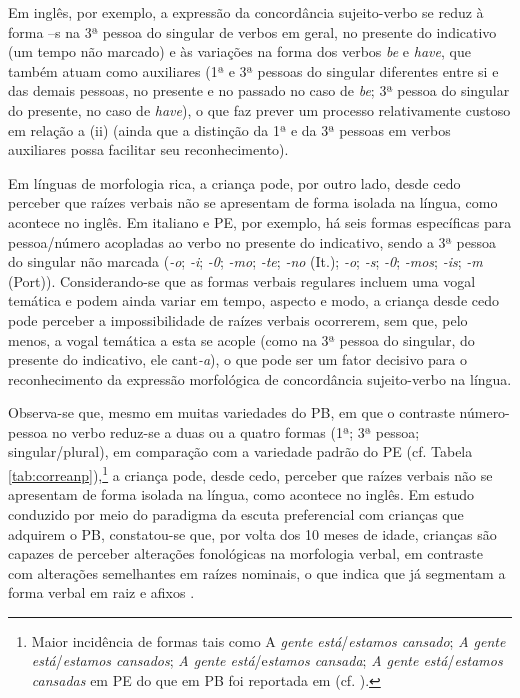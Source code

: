 \documentclass[output=paper]{LSP/langsci}
\begin{document}
Em inglês, por exemplo, a expressão da concordância sujeito-verbo se reduz à forma –s na 3ª pessoa do singular de verbos em geral, no presente do indicativo (um tempo não marcado) e às variações na forma dos verbos \textit{be} e \textit{have}, que também atuam como auxiliares (1ª e 3ª pessoas do singular diferentes entre si e das demais pessoas, no presente e no passado no caso de \textit{be}; 3ª pessoa do singular do presente, no caso de \textit{have}), o que faz prever um processo relativamente custoso em relação a (ii) (ainda que a distinção da 1ª e da 3ª pessoas em verbos auxiliares possa facilitar seu reconhecimento).

Em línguas de morfologia rica, a criança pode, por outro lado, desde cedo perceber que raízes verbais não se apresentam de forma isolada na língua, como acontece no inglês. Em italiano e PE, por exemplo, há seis formas específicas para pessoa/número acopladas ao verbo no presente do indicativo, sendo a 3ª pessoa do singular não marcada (\textit{-o}; \textit{-i}; \textit{-0}; \textit{-mo}; \textit{-te}; \textit{-no} (It.); \textit{-o}; \textit{-s}; \textit{-0}; \textit{-mos}; \textit{-is}; \textit{-m} (Port)). Considerando-se que as formas verbais regulares incluem uma vogal temática e podem ainda variar em tempo, aspecto e modo, a criança desde cedo pode perceber a impossibilidade de raízes verbais ocorrerem, sem que, pelo menos, a vogal temática a esta se acople (como na 3ª pessoa do singular, do presente do indicativo, ele cant\textit{-a}), o que pode ser um fator decisivo para o reconhecimento da expressão morfológica de concordância sujeito-verbo na língua. 

Observa-se que, mesmo em muitas variedades do PB, em que o contraste número-pessoa no verbo reduz-se a duas ou a quatro formas (1ª; 3ª pessoa; singular/plural), em comparação com a variedade padrão do PE (cf. Tabela \ref{tab:correanp}),\footnote{Maior incidência de formas tais como A\textit{ gente está}/\textit{estamos cansado}; \textit{A gente está}/\textit{estamos cansados}; \textit{A gente está}/e\textit{stamos cansada}; \textit{A gente está}/\textit{estamos cansadas} em PE do que em PB foi reportada em \citet{martoculio_etal2013} (cf. \citealt{vieirabrandao2014}).
} a criança pode, desde cedo, perceber que raízes verbais não se apresentam de forma isolada na língua, como acontece no inglês. Em estudo conduzido por meio do paradigma da escuta preferencial com crianças que adquirem o PB, constatou-se que, por volta dos 10 meses de idade, crianças são capazes de perceber alterações fonológicas na morfologia verbal, em contraste com alterações semelhantes em raízes nominais, o que indica que já segmentam a forma verbal em raiz e afixos \citep{bagetticorrea2011}.
\end{document}
